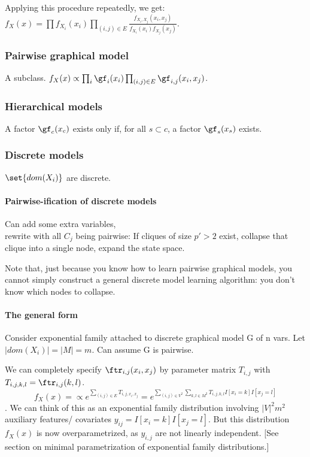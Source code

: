 \documentclass[oneside, article]{memoir}
\begin{document}
Applying this procedure repeatedly, we get: \\$f_X(x) = \prod f_{X_i}(x_i) \prod_{(i,j) \in E} \frac{f_{X_i, X_j}(x_i, x_j)}{f_{X_i}(x_i) f_{X_j}(x_j)}$.

\subsubsection{Pairwise graphical model}
A subclass. $f_X(x) \propto \prod_i \gf_i(x_i)\prod_{(i,j) \in E} \gf_{i, j}(x_i, x_j)$.

\subsubsection{Hierarchical models}
A factor $\gf_c(x_c)$ exists only if, for all $s \subset c$, a factor $\gf_s(x_s)$ exists.

\subsubsection{Discrete models}
$\set{dom(X_i)}$ are discrete.

\paragraph*{Pairwise-ification of discrete models}
Can add some extra variables, \\
rewrite with all $C_j$ being pairwise: If cliques of size $p'>2$ exist, collapse that clique into a single node, expand the state space.

Note that, just because you know how to learn pairwise graphical models, you cannot simply construct a general discrete model learning algorithm: you don't know which nodes to collapse.

\paragraph*{The general form}
Consider exponential family attached to discrete graphical model G of n vars. Let $|dom(X_i)| = |M| = m$. Can assume G is pairwise.

We can completely specify $\ftr_{i,j}(x_i, x_j)$ by parameter matrix $T_{i, j}$ with \\
$T_{i,j, k, l} = \ftr_{i,j}(k, l)$.
$$f_X(x) = \propto e^{\sum_{(i, j) \in E} T_{i,j, x_i, x_j} } = e^{\sum_{(i, j) \in V^{2}} \sum_{k, l \in M^{2}}T_{i,j, k, l} I[x_i = k] I[x_j = l]}$$.
We can think of this as an exponential family distribution involving $|V|^{2}m^{2}$ auxiliary features/ covariates $y_{ij} = I[x_i = k] I[x_j = l]$. But this distribution $f_X(x)$ is now overparametrized, as $y_{i,j}$ are not linearly independent. [See section on minimal parametrization of exponential family distributions.]
\end{document}
